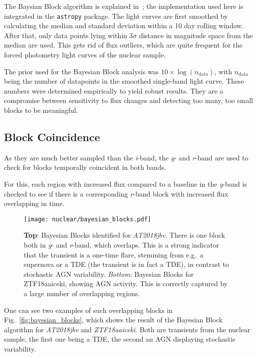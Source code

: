 The Baysian Block algorithm is explained in~; the implementation used here is integrated in the \texttt{astropy} package. The light curves are first smoothed by calculating the median and standard deviation within a 10 day rolling window. After that, only data points lying within $3 \sigma$ distance in magnitude space from the median are used. This gets rid of flux outliers, which are quite frequent for the forced photometry light curves of the nuclear sample.

The prior used for the Bayesian Block analysis was $10 \times \log(n_\text{data})$, with $n_\text{data}$ being the number of datapoints in the smoothed single-band light curve. These numbers were determined empirically to yield robust results. They are a compromise between sensitivity to flux changes and detecting too many, too small blocks to be meaningful.

\subsection{Block Coincidence}
As they are much better sampled than the \textit{i}-band, the \textit{g}- and \textit{r}-band are used to check for blocks temporally coincident in both bands.

For this, each region with increased flux compared to a baseline in the \textit{g}-band is checked to see if there is a corresponding \textit{r}-band block with increased flux overlapping in time.

\begin{figure}
    \texttt{[image: nuclear/bayesian\_blocks.pdf]}
    \caption[Bayesian Blocks]{\textbf{Top}: Bayesian Blocks identified for \textit{AT2018jbv}. There is one block both in \textit{g}- and \textit{r}-band, which overlaps. This is a strong indicator that the transient is a one-time flare, stemming from e.g.~a supernova or a TDE (the transient is in fact a TDE), in contrast to stochastic AGN variability. \textit{Bottom}: Bayesian Blocks for ZTF18aaiceki, showing AGN activity. This is correctly captured by a large number of overlapping regions.}
\end{figure}

One can see two examples of such overlapping blocks in Fig.~\ref{fig:bayesian_blocks}, which shows the result of the Bayesian Block algorithm for \textit{AT2018jbv} and \textit{ZTF18aaiceki}. Both are transients from the nuclear sample, the first one being a TDE, the second an AGN displaying stochastic variability.

